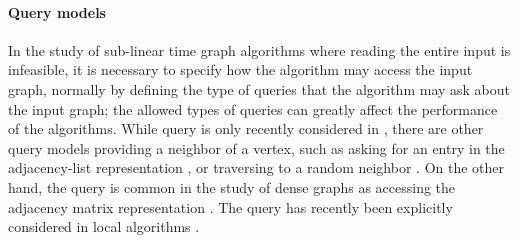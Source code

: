 \paragraph{Query models}
In the study of sub-linear time graph algorithms where reading the entire input is infeasible,
it is necessary to specify how the algorithm may access the input graph,
normally by defining the type of queries that the algorithm may ask about the input graph;
the allowed types of queries 
can greatly affect the performance of the algorithms.
While  query is only recently considered in \cite{reut},
there are other query models providing a neighbor of a vertex,
such as asking for an entry in the adjacency-list representation \cite{goldreich1997property},
or traversing to a random neighbor \cite{brautbar2010local}. On the other hand,
the
 query is common in the study of dense graphs as accessing the adjacency matrix representation \cite{goldreich1998property}.
The  query has recently been explicitly considered in local algorithms \cite{feige2017probe}.
